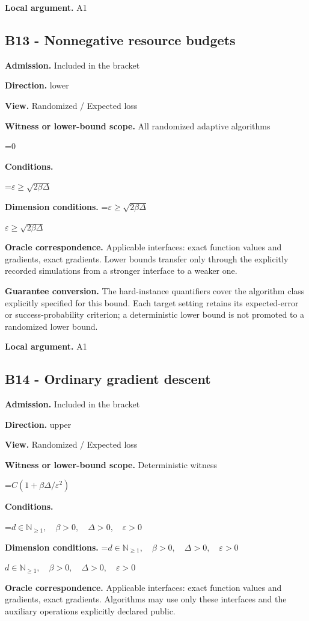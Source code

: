 \documentclass[10pt,a4paper]{article}
\newcommand{\AtlasMath}[1]{\par\begingroup\centering\setbox0=\hbox{$\displaystyle #1$}\ifdim\wd0>1.4\linewidth\typeout{ATLAS WIDE FORMULA: \the\wd0}\fi\ifdim\wd0>\linewidth\resizebox{\linewidth}{!}{\box0}\else\box0\fi\par\endgroup}
\newcommand{\AtlasInlineMath}[1]{\begingroup\setbox0=\hbox{$#1$}\ifdim\wd0>.4\linewidth\endgroup\AtlasMath{#1}\else\endgroup$#1$\fi}
\begin{document}
\textbf{Local argument.} A1

\subsection{B13 - Nonnegative resource budgets}
\textbf{Admission.} Included in the bracket

\textbf{Direction.} lower

\textbf{View.} Randomized / Expected loss

\textbf{Witness or lower-bound scope.} All randomized adaptive algorithms

\AtlasMath{0}
\textbf{Conditions.} 
\AtlasMath{\varepsilon\ge\sqrt{2\beta\Delta}}


\textbf{Dimension conditions.} \AtlasInlineMath{\varepsilon\ge\sqrt{2\beta\Delta}}

\textbf{Oracle correspondence.} Applicable interfaces: exact function values and gradients, exact gradients. Lower bounds transfer only through the explicitly recorded simulations from a stronger interface to a weaker one.

\textbf{Guarantee conversion.} The hard-instance quantifiers cover the algorithm class explicitly specified for this bound. Each target setting retains its expected-error or success-probability criterion; a deterministic lower bound is not promoted to a randomized lower bound.

\textbf{Local argument.} A1

\subsection{B14 - Ordinary gradient descent}
\textbf{Admission.} Included in the bracket

\textbf{Direction.} upper

\textbf{View.} Randomized / Expected loss

\textbf{Witness or lower-bound scope.} Deterministic witness

\AtlasMath{C(1+\beta\Delta/\varepsilon^2)}
\textbf{Conditions.} 
\AtlasMath{d\in\mathbb{N}_{\ge1},\quad \beta>0,\quad \Delta>0,\quad \varepsilon>0}


\textbf{Dimension conditions.} \AtlasInlineMath{d\in\mathbb{N}_{\ge1},\quad \beta>0,\quad \Delta>0,\quad \varepsilon>0}

\textbf{Oracle correspondence.} Applicable interfaces: exact function values and gradients, exact gradients. Algorithms may use only these interfaces and the auxiliary operations explicitly declared public.
\end{document}
